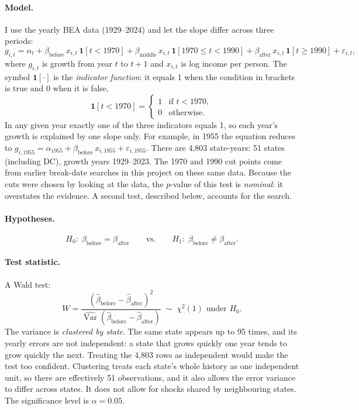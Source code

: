 \documentclass[11pt]{article}
\begin{document}
\paragraph{Model.} I use the yearly BEA data (1929--2024) and let the slope differ across three
periods:
\begin{equation}
g_{i,t} = \alpha_t + \beta_{\text{before}}\, x_{i,t}\,\mathbf{1}[t<1970]
        + \beta_{\text{middle}}\, x_{i,t}\,\mathbf{1}[1970 \le t < 1990]
        + \beta_{\text{after}}\, x_{i,t}\,\mathbf{1}[t \ge 1990] + \varepsilon_{i,t},
\label{eq:test}
\end{equation}
where $g_{i,t}$ is growth from year $t$ to $t+1$ and $x_{i,t}$ is log income per person. The
symbol $\mathbf{1}[\cdot]$ is the \emph{indicator function}: it equals 1 when the condition in
brackets is true and 0 when it is false,
\[
\mathbf{1}[t < 1970] =
\begin{cases}
1 & \text{if } t < 1970,\\
0 & \text{otherwise.}
\end{cases}
\]
In any given year exactly one of the three indicators equals 1, so each year's growth is
explained by one slope only. For example, in 1955 the equation reduces to
$g_{i,1955} = \alpha_{1955} + \beta_{\text{before}}\, x_{i,1955} + \varepsilon_{i,1955}$. There are
4,803 state-years: 51 states (including DC), growth years 1929--2023. The 1970 and 1990 cut points
come from earlier break-date searches in this project on these same data. Because the cuts were
chosen by looking at the data, the $p$-value of this test is \emph{nominal}: it overstates the
evidence. A second test, described below, accounts for the search.

\paragraph{Hypotheses.}
\[
H_0:\; \beta_{\text{before}} = \beta_{\text{after}}
\qquad\text{vs.}\qquad
H_1:\; \beta_{\text{before}} \ne \beta_{\text{after}}.
\]

\paragraph{Test statistic.} A Wald test:
\[
W = \frac{(\hat\beta_{\text{before}} - \hat\beta_{\text{after}})^2}
         {\widehat{\operatorname{Var}}(\hat\beta_{\text{before}} - \hat\beta_{\text{after}})}
\;\sim\; \chi^2(1) \text{ under } H_0 .
\]
The variance is \emph{clustered by state}. The same state appears up to 95 times, and its yearly errors
are not independent: a state that grows quickly one year tends to grow quickly the next. Treating
the 4,803 rows as independent would make the test too confident. Clustering treats each state's
whole history as one independent unit, so there are effectively 51 observations, and it also
allows the error variance to differ across states. It does not allow for shocks shared by
neighbouring states. The significance level is $\alpha = 0.05$.
\end{document}
